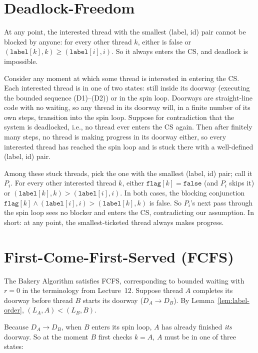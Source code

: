 \section{Deadlock-Freedom}

\begin{ppkey}
\par
At any point, the interested thread with the smallest (label, id) pair cannot
be blocked by anyone: for every other thread $k$, either  is
false or $(\texttt{label}[k], k) \geq (\texttt{label}[i], i)$. So it always
enters the CS, and deadlock is impossible.
\end{ppkey}

Consider any moment at which some thread is interested in entering the CS.
Each interested thread is in one of two states: still inside its doorway
(executing the bounded sequence (D1)--(D2)) or in the spin loop. Doorways are
straight-line code with no waiting, so any thread in its doorway will, in a
finite number of its own steps, transition into the spin loop. Suppose for
contradiction that the system is deadlocked, i.e., no thread ever enters the
CS again. Then after finitely many steps, no thread is making progress in its
doorway either, so every interested thread has reached the spin loop and is
stuck there with a well-defined (label, id) pair.

Among these stuck threads, pick the one with the smallest (label, id) pair;
call it $P_i$. For every other interested thread $k$, either
$\texttt{flag}[k] = \texttt{false}$ (and $P_i$ skips it) or
$(\texttt{label}[k], k) > (\texttt{label}[i], i)$. In both cases, the blocking
conjunction $\texttt{flag}[k] \wedge (\texttt{label}[i], i) >
(\texttt{label}[k], k)$ is false. So $P_i$'s next pass through the spin
loop sees no blocker and enters the CS, contradicting our assumption. In
short: at any point, the smallest-ticketed thread always makes progress.

\section{First-Come-First-Served (FCFS)}

The Bakery Algorithm satisfies FCFS, corresponding to bounded waiting with
$r=0$ in the terminology from Lecture~12. Suppose thread $A$ completes its
doorway before thread $B$ starts its doorway ($D_A \to D_B$). By
Lemma~\ref{lem:label-order}, $(L_A, A) < (L_B, B)$.

Because $D_A \to D_B$, when $B$ enters its spin loop, $A$ has already
finished \emph{its} doorway. So at the moment $B$ first checks $k=A$, $A$
must be in one of three states:

